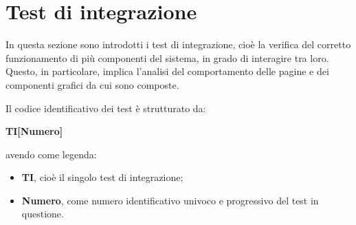 \section{Test di integrazione}\label{sec:verifica-validazione-integrazione}

In questa sezione sono introdotti i test di integrazione, cioè la verifica del corretto funzionamento di più componenti del sistema, in grado di interagire tra loro.
Questo, in particolare, implica l'analisi del comportamento delle pagine e dei componenti grafici da cui sono composte.

Il codice identificativo dei test è strutturato da:
\begin{center}
    \textbf{TI[Numero]}
  \end{center}
\textbf{}
avendo come legenda:
\begin{itemize}
\item \textbf{TI}, cioè il singolo test di integrazione;
\item \textbf{Numero}, come numero identificativo univoco e progressivo del test in questione.
\end{itemize}

